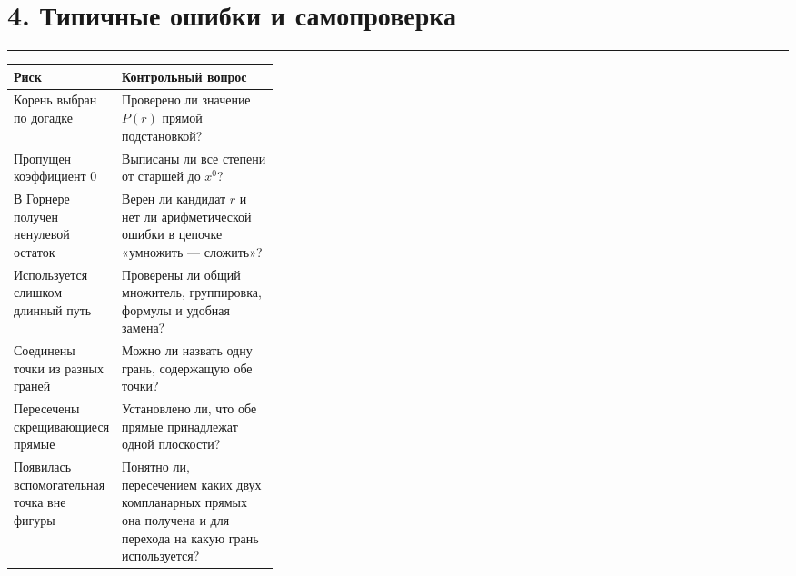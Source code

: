 \documentclass[a4paper,12pt]{article}
\newcommand{\sectionline}{%
  \vspace{-0.35em}\par\noindent
  \textcolor{accent!55}{\rule{\linewidth}{0.45pt}}\vspace{0.35em}
}
\begin{document}
\clearpage


\section*{4. Типичные ошибки и самопроверка}
\sectionline

\renewcommand{\arraystretch}{1.28}

\begin{tabularx}{
  \linewidth
}{
  @{}
  >{\raggedright\arraybackslash}p{0.34\linewidth}
  X
  @{}
}

\toprule

\textbf{Риск}
&
\textbf{Контрольный вопрос}
\\

\midrule

Корень выбран по догадке
&
Проверено ли значение $P(r)$ прямой подстановкой?
\\

Пропущен коэффициент $0$
&
Выписаны ли все степени от старшей до $x^0$?
\\

В Горнере получен ненулевой остаток
&
Верен ли кандидат $r$
и нет ли арифметической ошибки
в цепочке «умножить --- сложить»?
\\

Используется слишком длинный путь
&
Проверены ли общий множитель,
группировка,
формулы
и удобная замена?
\\

Соединены точки из разных граней
&
Можно ли назвать одну грань,
содержащую обе точки?
\\

Пересечены скрещивающиеся прямые
&
Установлено ли,
что обе прямые принадлежат одной плоскости?
\\

Появилась вспомогательная точка вне фигуры
&
Понятно ли,
пересечением каких двух компланарных прямых
она получена
и для перехода на какую грань используется?
\\

\bottomrule

\end{tabularx}

\end{document}
